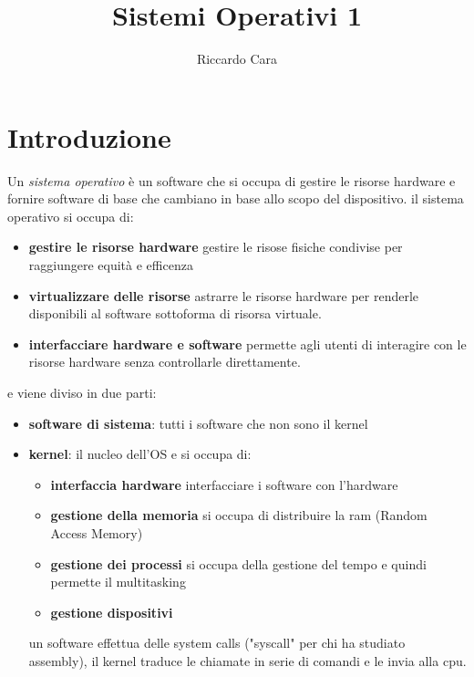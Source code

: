 \documentclass{article}
\title{Sistemi Operativi 1}
\author{Riccardo Cara}
\begin{document}
\maketitle
\tableofcontents
\newpage

\section{Introduzione}

    Un \textit{sistema operativo} è un software che si occupa di gestire le risorse hardware e fornire software di base che cambiano in base allo scopo del dispositivo.
    il sistema operativo si occupa di:

    \begin{itemize}
        \item \textbf{gestire le risorse hardware}
        gestire le risose fisiche condivise per raggiungere equità e efficenza
        \item \textbf{virtualizzare delle risorse}
        astrarre le risorse hardware per renderle disponibili al software sottoforma di risorsa virtuale.
        \item \textbf{interfacciare hardware e software}
        permette agli utenti di interagire con le risorse hardware senza controllarle direttamente.
    \end{itemize}
    e viene diviso in due parti:

    \begin{itemize}
        \item \textbf{software di sistema}:
        tutti i software che non sono il kernel

        \item \textbf{kernel}:
        il nucleo dell'OS e si occupa di:
        
            \begin{itemize}
                \item \textbf{interfaccia hardware}
                interfacciare  i software con l'hardware

                \item \textbf{gestione della memoria}
                si occupa di distribuire la ram (Random Access Memory)
                
                \item \textbf{gestione dei processi}
                si occupa della gestione del tempo e quindi permette il multitasking
                
                \item \textbf{gestione dispositivi}
            \end{itemize}
            un software effettua delle system calls ("syscall" per chi ha studiato assembly), il kernel traduce le chiamate in serie di comandi e le invia alla cpu.
        
        
    \end{itemize}
\end{document}
